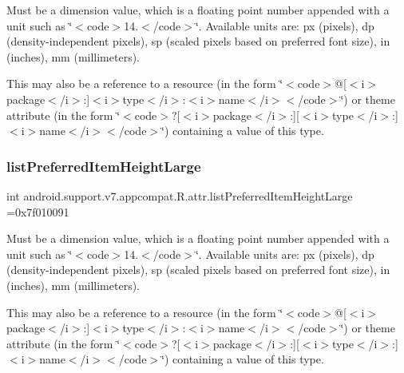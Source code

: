 Must be a dimension value, which is a floating point number appended with a unit such as \char`\"{}$<$code$>$14.\+5sp$<$/code$>$\char`\"{}. Available units are\+: px (pixels), dp (density-\/independent pixels), sp (scaled pixels based on preferred font size), in (inches), mm (millimeters). 

This may also be a reference to a resource (in the form \char`\"{}$<$code$>$@\mbox{[}$<$i$>$package$<$/i$>$\+:\mbox{]}$<$i$>$type$<$/i$>$\+:$<$i$>$name$<$/i$>$$<$/code$>$\char`\"{}) or theme attribute (in the form \char`\"{}$<$code$>$?\mbox{[}$<$i$>$package$<$/i$>$\+:\mbox{]}\mbox{[}$<$i$>$type$<$/i$>$\+:\mbox{]}$<$i$>$name$<$/i$>$$<$/code$>$\char`\"{}) containing a value of this type. \mbox{\label{classandroid_1_1support_1_1v7_1_1appcompat_1_1R_1_1attr_acae731c234d2a8927d87b3ecd2fedc93}} 
\subsubsection{\texorpdfstring{list\+Preferred\+Item\+Height\+Large}{listPreferredItemHeightLarge}}
{\footnotesize\ttfamily int android.\+support.\+v7.\+appcompat.\+R.\+attr.\+list\+Preferred\+Item\+Height\+Large =0x7f010091\hspace{0.3cm}{\ttfamily [static]}}

Must be a dimension value, which is a floating point number appended with a unit such as \char`\"{}$<$code$>$14.\+5sp$<$/code$>$\char`\"{}. Available units are\+: px (pixels), dp (density-\/independent pixels), sp (scaled pixels based on preferred font size), in (inches), mm (millimeters). 

This may also be a reference to a resource (in the form \char`\"{}$<$code$>$@\mbox{[}$<$i$>$package$<$/i$>$\+:\mbox{]}$<$i$>$type$<$/i$>$\+:$<$i$>$name$<$/i$>$$<$/code$>$\char`\"{}) or theme attribute (in the form \char`\"{}$<$code$>$?\mbox{[}$<$i$>$package$<$/i$>$\+:\mbox{]}\mbox{[}$<$i$>$type$<$/i$>$\+:\mbox{]}$<$i$>$name$<$/i$>$$<$/code$>$\char`\"{}) containing a value of this type. \mbox{\label{classandroid_1_1support_1_1v7_1_1appcompat_1_1R_1_1attr_a7c60f3752499ca7d45fa41451e0de852}} 
